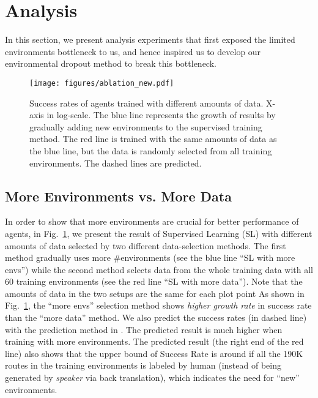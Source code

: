 \documentclass[11pt,a4paper]{article}
\begin{document}
\section{Analysis}
\label{sec:analysis}
In this section, we present analysis experiments that first exposed the limited environments bottleneck to us, and hence inspired us to develop our environmental dropout method to break this bottleneck.
\begin{figure}[t]
  \texttt{[image: figures/ablation\_new.pdf]} 
\caption{
Success rates of agents trained with different amounts of data. X-axis in log-scale.
The blue line represents the growth of results by gradually adding new environments to the supervised training method.
The red line is trained with the same amounts of data as the blue line, but the data is randomly selected from all  training environments.
The dashed lines are predicted.
}
\label{fig:analysis}
\vspace{-10pt}
\end{figure}

\subsection{More Environments vs. More Data}
\label{sec:necessary}
In order to show that more environments are crucial for  better performance of agents, in Fig.~\ref{fig:analysis}, we present the result of Supervised Learning (SL) with different amounts of data selected by two different data-selection methods.
The first method gradually uses more \#environments (see the blue line ``SL with more envs'') while the second method selects data from the whole training data with all 60 training environments (see the red line ``SL with more data''). Note that the amounts of data in the two setups are the same for each plot point
As shown in Fig.~\ref{fig:analysis}, the ``more envs'' selection method shows \emph{higher growth rate} in success rate than the ``more data'' method. 
We also predict the success rates (in dashed line) with the prediction method in .
The predicted result is much higher when training with more environments.
The predicted result (the right end of the red line) also shows that the upper bound of Success Rate is around  if all the 190K routes in the training environments is labeled by human (instead of being generated by \textit{speaker} via back translation), which indicates the need for ``new'' environments.
\end{document}
